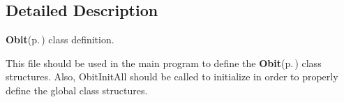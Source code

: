 \subsection{Detailed Description}
{\bf Obit}{\rm (p.\,\pageref{structObit})} class definition. 

This file should be used in the main program to define the {\bf Obit}{\rm (p.\,\pageref{structObit})} class structures. Also, Obit\-Init\-All should be called to initialize in order to properly define the global class structures.